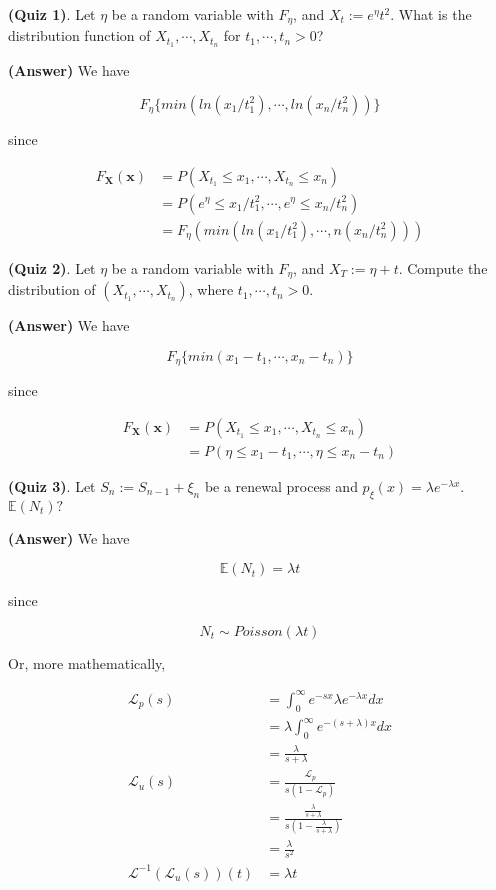 \documentclass[12pt]{article}
\theoremstyle{nonumberbreak}
\begin{document}
\textbf{(Quiz 1)}. Let $\eta$ be a random variable with $F_\eta$, and $X_t := e^\eta t^2$. What is the distribution function of $X_{t_1}, \cdots, X_{t_n}$ for $t_1, \cdots, t_n >0$? 

\textbf{(Answer)} We have

$$
F_{\eta} \{ min \left( ln(x_1/t_1^2), \cdots, ln(x_n/t_n^2) \right) \}
$$

since

$$
\begin{aligned}
F_\mathbf{X} (\mathbf{x}) &= P(X_{t_1} \le x_1, \cdots, X_{t_n} \le x_n) \\[8pt]
&= P(e^\eta  \le x_1/t_1^2, \cdots, e^\eta  \le x_n/t_n^2)  \\[8pt]
&= F_\eta (min (ln(x_1/t_1^2), \cdots, n(x_n/t_n^2)))
\end{aligned}
$$


\textbf{(Quiz 2)}. Let $\eta$ be a random variable with $F_\eta$, and $X_T := \eta + t$. Compute the distribution of $(X_{t_1}, \cdots, X_{t_n})$, where $t_1, \cdots, t_n >0$. 

\textbf{(Answer)} We have

$$
F_{\eta} \{ min \left( x_1 - t_1, \cdots, x_n - t_n \right) \}
$$

since

$$
\begin{aligned}
F_\mathbf{X} (\mathbf{x}) &= P(X_{t_1} \le x_1, \cdots, X_{t_n} \le x_n) \\[8pt]
&= P(\eta \le x_1 - t_1, \cdots, \eta \le x_n - t_n)
\end{aligned}
$$


\textbf{(Quiz 3)}. Let $S_n := S_{n-1} + \xi_n$ be a renewal process and $p_\xi (x) = \lambda e^{-\lambda x}$. $\mathbb{E}(N_t)?$

\textbf{(Answer)} We have

$$
\mathbb{E}(N_t) = \lambda t
$$

since

$$
N_t \sim Poisson(\lambda t)
$$

Or, more mathematically, 

$$
\begin{aligned}
\mathcal{L}_p (s) &= \int_0^\infty e^{-sx} \lambda e^{-\lambda x} dx \\[8pt]
&= \lambda \int_0^\infty e^{-(s+\lambda)x} dx \\[8pt]
&= \frac{\lambda}{s + \lambda} \\[10pt]
\mathcal{L}_u (s) &= \frac{\mathcal{L}_p}{s(1-\mathcal{L}_p)} \\[8pt]
&= \frac{\frac{\lambda}{s + \lambda}}{s(1-\frac{\lambda}{s + \lambda})} \\[8pt]
&= \frac{\lambda}{s^2} \\[10pt]
\mathcal{L}^{-1}(\mathcal{L}_u (s))(t) &= \lambda t
\end{aligned}
$$
\end{document}
